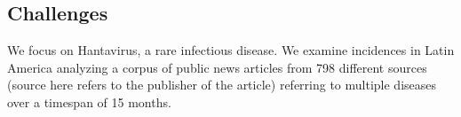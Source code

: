 \documentclass[twoside,leqno,twocolumn]{article}
\begin{document}
\subsection{Challenges}
\label{sec:challenges}
We focus on Hantavirus, a rare infectious disease. We examine incidences in Latin America analyzing a corpus of public news articles from 798 different sources (source here refers to the publisher of the article) referring to multiple diseases over a timespan of 15 months. 

\begin{figure}[ht]
\captionsetup{font=small}
\begin{center}

\end{center}
\end{figure}
\end{document}
